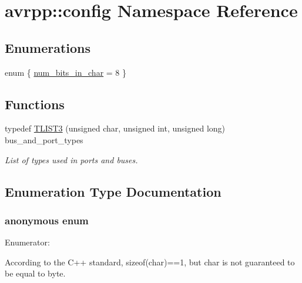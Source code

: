 \hypertarget{namespaceavrpp_1_1config}{
\section{avrpp::config Namespace Reference}
\label{namespaceavrpp_1_1config}
}
\subsection*{Enumerations}
\begin{DoxyCompactItemize}
\item 
enum \{ \hyperlink{namespaceavrpp_1_1config_a3474da9704e717eea10ac0f406f2c473abef48e1d2af81ac49e938808e0764bbd}{num\_\-bits\_\-in\_\-char} =  8
 \}
\end{DoxyCompactItemize}
\subsection*{Functions}
\begin{DoxyCompactItemize}
\item 
typedef \hyperlink{namespaceavrpp_1_1config_a4281869625420492421b68b0a5f9668f}{TLIST3} (unsigned char, unsigned int, unsigned long) bus\_\-and\_\-port\_\-types
\begin{DoxyCompactList}\small\item\em List of types used in ports and buses. \item\end{DoxyCompactList}\end{DoxyCompactItemize}


\subsection{Enumeration Type Documentation}
\hypertarget{namespaceavrpp_1_1config_a3474da9704e717eea10ac0f406f2c473}{
\subsubsection[{"@22}]{\setlength{\rightskip}{0pt plus 5cm}anonymous enum}}
\label{namespaceavrpp_1_1config_a3474da9704e717eea10ac0f406f2c473}
\begin{Desc}
\item[Enumerator: ]\par
\begin{description}
\item[{\em 
\hypertarget{namespaceavrpp_1_1config_a3474da9704e717eea10ac0f406f2c473abef48e1d2af81ac49e938808e0764bbd}{
num\_\-bits\_\-in\_\-char}
\label{namespaceavrpp_1_1config_a3474da9704e717eea10ac0f406f2c473abef48e1d2af81ac49e938808e0764bbd}
}]According to the C++ standard, sizeof(char)==1, but char is not guaranteed to be equal to byte. \end{description}
\end{Desc}



